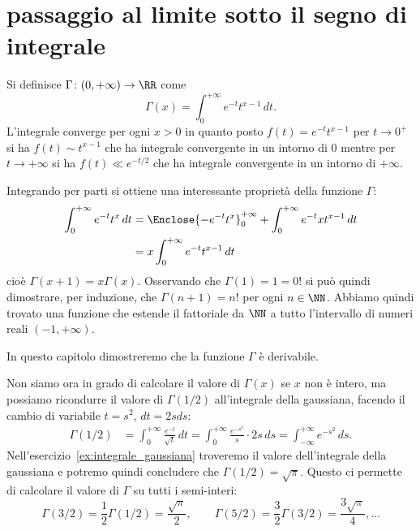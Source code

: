 \section{passaggio al limite sotto il segno di integrale}
\label{sec:scambio_integrale_limite}%

\begin{example}%
  \label{ex:gamma_eulero}%
  Si definisce $\Gamma\colon (0,+\infty) \to \RR$ come
  \[
    \Gamma(x) = \int_0^{+\infty} e^{-t} t^{x-1}\, dt.
  \]
  L'integrale converge per ogni $x>0$ in quanto posto
  $f(t) = e^{-t} t^{x-1}$ per $t\to 0^+$ si ha $f(t) \sim t^{x-1}$ che ha
  integrale convergente in un intorno di $0$ mentre per $t\to +\infty$ si ha
  $f(t) \ll e^{-t/2}$ che ha integrale convergente in un intorno di $+\infty$.
  
  Integrando per parti si ottiene una interessante proprietà della funzione $\Gamma$:
  \begin{align*}
  \int_0^{+\infty} e^{-t}t^{x}\, dt
  &= \Enclose{-e^{-t}t^{x}}_0^{+\infty}
  + \int_0^{+\infty} e^{-t}xt^{x-1}\, dt\\
  &= x\int_0^{+\infty} e^{-t}t^{x-1}\, dt
  \end{align*}
  cioè $\Gamma(x+1) = x\Gamma(x)$.
  Osservando che $\Gamma(1)=1=0!$ si può quindi dimostrare, per induzione,
  che $\Gamma(n+1) = n!$ per ogni $n\in \NN$.
  Abbiamo quindi trovato una funzione che estende il fattoriale
  da $\NN$ a tutto l'intervallo di numeri reali $(-1,+\infty)$.
  
  In questo capitolo dimostreremo 
  che la funzione $\Gamma$ è derivabile.
  
  Non siamo ora in grado di calcolare il valore di $\Gamma(x)$ se $x$ 
  non è intero, ma possiamo ricondurre il valore di $\Gamma(1/2)$ 
  all'integrale della gaussiana, facendo il cambio 
  di variabile $t=s^2$, $dt=2s ds$:
  \begin{align*}
  \Gamma(1/2) 
  &= \int_0^{+\infty} \frac{e^{-t}}{\sqrt t}\, dt  
  = \int_0^{+\infty} \frac{e^{-s^2}}{s} \cdot 2s\, ds
  = \int_{-\infty}^{+\infty} e^{-s^2}\, ds.
  \end{align*}
  Nell'esercizio~\ref{ex:integrale_gaussiana} troveremo il valore 
  dell'integrale della gaussiana e potremo 
  quindi concludere che $\Gamma(1/2) = \sqrt \pi$.
  Questo ci permette di calcolare il valore di $\Gamma$ su 
  tutti i semi-interi:
  \[
  \Gamma(3/2) = \frac 1 2 \Gamma(1/2) = \frac{\sqrt \pi}{2}, \qquad
  \Gamma(5/2) = \frac 3 2 \Gamma(3/2) = \frac{3\sqrt \pi}{4}, \dots 
  \]
\end{example}
    
